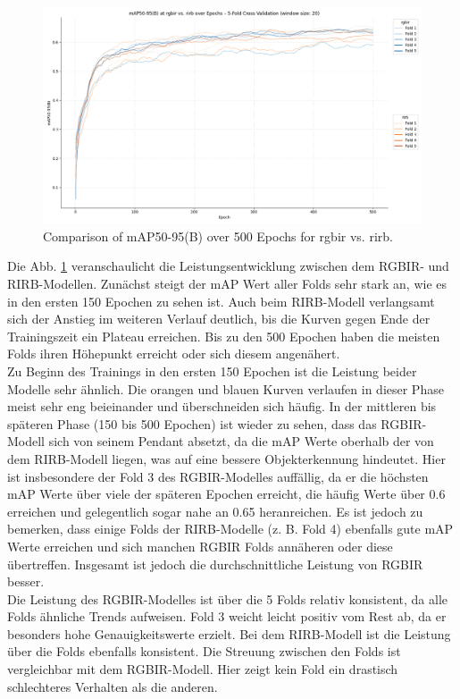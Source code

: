 \begin{figure}[h] 
    \centering %
    \includegraphics[width=1\textwidth]{images/rgbir/mAP@50-95/rgbir_vs_rirb_full.png} %
    \caption{Comparison of mAP50-95(B) over 500 Epochs for rgbir vs. rirb.} %
    \label{fig:map_rgbir_rirb} %
\end{figure}
Die Abb. \ref{fig:map_rgbir_rirb} veranschaulicht die Leistungsentwicklung zwischen dem RGBIR- und RIRB-Modellen. Zunächst steigt der mAP Wert aller Folds sehr stark an, wie es in den ersten 150 Epochen zu sehen ist. Auch beim RIRB-Modell verlangsamt sich der Anstieg im weiteren Verlauf deutlich, bis die Kurven gegen Ende der Trainingszeit ein Plateau erreichen. Bis zu den 500 Epochen haben die meisten Folds ihren Höhepunkt erreicht oder sich diesem angenähert. \\
Zu Beginn des Trainings in den ersten 150 Epochen ist die Leistung beider Modelle sehr ähnlich. Die orangen und blauen Kurven verlaufen in dieser Phase meist sehr eng beieinander und überschneiden sich häufig. In der mittleren bis späteren Phase (150 bis 500 Epochen) ist wieder zu sehen, dass das RGBIR-Modell sich von seinem Pendant absetzt, da die mAP Werte oberhalb der von dem RIRB-Modell liegen, was auf eine bessere Objekterkennung hindeutet. Hier ist insbesondere der Fold 3 des RGBIR-Modelles auffällig, da er die höchsten mAP Werte über viele der späteren Epochen erreicht, die häufig Werte über 0.6 erreichen und gelegentlich sogar nahe an 0.65 heranreichen. Es ist jedoch zu bemerken, dass einige Folds der RIRB-Modelle (z. B. Fold 4) ebenfalls gute mAP Werte erreichen und sich manchen RGBIR Folds annäheren oder diese übertreffen. Insgesamt ist jedoch die durchschnittliche Leistung von RGBIR besser. \\
Die Leistung des RGBIR-Modelles ist über die 5 Folds relativ konsistent, da alle Folds ähnliche Trends aufweisen. Fold 3 weicht leicht positiv vom Rest ab, da er besonders hohe Genauigkeitswerte erzielt. Bei dem RIRB-Modell ist die Leistung über die Folds ebenfalls konsistent. Die Streuung zwischen den Folds ist vergleichbar mit dem RGBIR-Modell. Hier zeigt kein Fold ein drastisch schlechteres Verhalten als die anderen. \\

